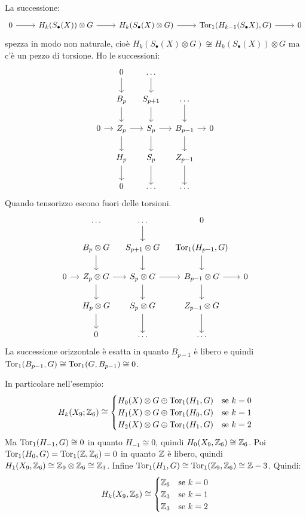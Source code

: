\begin{theorem}
  La successione:
  \[
    \begin{tikzcd}
      0 \rar & H_k(S_\bullet(X)) \otimes G \rar & H_k(S_\bullet(X) \otimes G) \rar & \tor{H_{k-1}(S_\bullet{X}), G} \rar & 0
    \end{tikzcd}
  \]
  spezza in modo non naturale, cioè $ H_k(S_\bullet(X) \otimes G) \not \cong H_k(S_\bullet(X)) \otimes G $ ma c'è un pezzo
  di torsione.
  Ho le successioni:
  \[
    \begin{tikzcd}[nodes = {column sep = 10pt}]
      {} & 0 \dar & \dots \dar & {} & {} \\
      {} & B_p \dar & S_{p+1} \dar & \dots \dar &  \\
      0 \rar & Z_p \dar \rar & S_p \dar \rar & B_{p-1} \rar \dar  & 0 \\
      {} & H_p \dar & S_p \dar & Z_{p-1} \dar & {} \\
      {} & 0 & \dots & \dots & {}
    \end{tikzcd}
  \]
  Quando tensorizzo escono fuori delle torsioni.
  \[
    \begin{tikzcd}[nodes = {column sep = 10pt}]
      {}     & \dots                 & \dots \dar            & 0                 & {} \\
      {}     & B_p \otimes G \dar      & S_{p+1} \otimes G\dar   & \tor{H_{p-1},G} \dar            &    \\
      0 \rar & Z_p \otimes G \dar \rar & S_p \otimes G \dar \rar & B_{p-1} \otimes G \rar \dar & 0  \\
      {}     & H_p \otimes G \dar      & S_p \otimes G \dar      & Z_{p-1} \otimes G \dar      & {} \\
      {}     & 0                 & \dots                 & \dots                 & {}
    \end{tikzcd}
  \]
  La successione orizzontale è esatta in quanto $ B_{p-1} $ è libero e quindi
  $ \mathrm{Tor_1}( B_{p-1}, G) \cong \mathrm{Tor_1}( G, B_{p-1}) \cong 0 $.
\end{theorem}

In particolare nell'esempio:
\[
  H_k(X_9; \mathbb{Z}_6) \cong
  \begin{cases}
    H_0(X) \otimes G \oplus \mathrm{Tor_1}( H_1,G) & \text{se } k = 0 \\
    H_1(X) \otimes G \oplus \mathrm{Tor_1}( H_0,G) & \text{se } k = 1 \\
    H_2(X) \otimes G \oplus \mathrm{Tor_1}( H_1,G) & \text{se } k = 2
  \end{cases}
\]
Ma $ \mathrm{Tor_1}( H_{-1}, G) \cong 0 $ in quanto $ H_{-1} \cong 0 $, quindi
$ H_0(X_9, \mathbb{Z}_6) \cong \mathbb{Z}_6 $. Poi $ \mathrm{Tor_1}( H_0, G) = \mathrm{Tor_1}( \mathbb{Z}, \mathbb{Z}_6) = 0 $ in quanto
$ \mathbb{Z} $ è libero, quindi $ H_1(X_9, \mathbb{Z}_6) \cong \mathbb{Z}_9 \otimes \mathbb{Z}_6 \cong \mathbb{Z}_3 $. Infine
$ \mathrm{Tor_1}( H_1, G) \cong \mathrm{Tor_1}( \mathbb{Z}_9, \mathbb{Z}_6) \cong \mathbb{Z}-3 $. Quindi:
\[
  H_k(X_9, \mathbb{Z}_6) \cong
  \begin{cases}
    \mathbb{Z}_6 & \text{se } k = 0 \\
    \mathbb{Z}_3 & \text{se } k = 1 \\
    \mathbb{Z}_3 & \text{se } k = 2
  \end{cases}
\]

